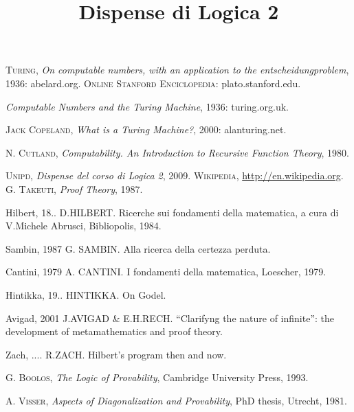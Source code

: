 \documentclass[10pt,a4paper]{amsbook}
\title{Dispense di Logica 2}
\author{}
\date{}
\begin{document}
\maketitle

\tableofcontents



%


%
%
%
%
%
%

\begin{thebibliography} {}
 \textsc{Turing}, \textsl{On computable numbers, with an
application to the entscheidungproblem}, 1936: abelard.org.
 \textsc{Online Stanford Enciclopedia}: plato.stanford.edu.

 \textsl{Computable Numbers and the Turing Machine}, 1936:
turing.org.uk.

 \textsc{Jack Copeland}, \textsl{What is a Turing Machine?}, 2000:
alanturing.net.

 \textsc{N. Cutland}, \textsl{Computability. An
  Introduction to Recursive Function Theory}, 1980.

 \textsc{Unipd}, \textsl{Dispense del corso di Logica 2},
  2009.
 \textsc{Wikipedia}, \url{http://en.wikipedia.org}.
 \textsc{G. Takeuti}, \textsl{Proof Theory}, 1987.

\bibitem{key-1}{[}Hilbert, 18.. D.HILBERT. Ricerche sui fondamenti
della matematica, a cura di V.Michele Abrusci, Bibliopolis, 1984.

\bibitem{key-4}{[}Sambin, 1987 G. SAMBIN. Alla ricerca della certezza
perduta. 

\bibitem{key-5}{[}Cantini, 1979 A. CANTINI. I fondamenti della matematica,
Loescher, 1979.

\bibitem{key-8}{[}Hintikka, 19.. HINTIKKA. On Godel.

\bibitem{key-1}{[}Avigad, 2001 J.AVIGAD \& E.H.RECH. {}``Clarifyng
the nature of infinite'': the development of metamathematics and
proof theory.

\bibitem{key-1}{[}Zach, .... R.ZACH. Hilbert's program then and now.

 \textsc{G. Boolos}, \textsl{The Logic of Provability}, Cambridge University Press, 1993.

 \textsc{A. Visser}, \textsl{Aspects of Diagonalization and Provability}, PhD thesis, Utrecht, 1981.

\end{thebibliography}
\end{document}
